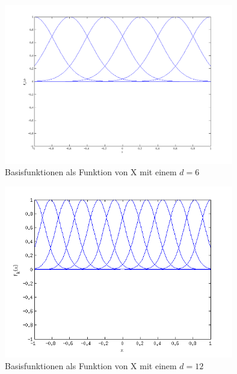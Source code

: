 \begin{figure}[hp!]
\begin{center}
 \includegraphics[width=10cm]{./figures/RBF_6}
 \caption[Basisfunktionen als Funktion von X (d=6)]{Basisfunktionen als Funktion von X mit einem $d=6$}
\label{fig:RBF_6}
\end{center}
\end{figure}

\begin{figure}[hp!]
\begin{center}
 \includegraphics[width=10cm]{./figures/RBF_12}
 \caption[Basisfunktionen als Funktion von X, d=12]{Basisfunktionen als Funktion von X mit einem $d=12$}
\label{fig:RBF_12}
\end{center}
\end{figure}


